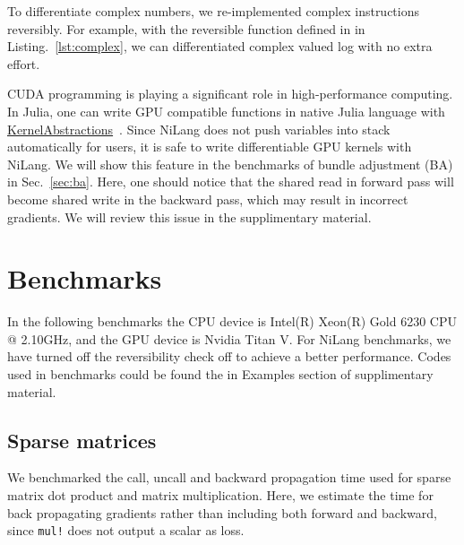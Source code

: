 \documentclass{article}
\newcommand{\<}{\langle}
\renewcommand{\>}{\rangle}
\newcommand{\Lst}[1]{Listing.~\ref{#1}}
\newcommand{\Sec}[1]{Sec.~\ref{#1}}
\theoremstyle{definition}\newtheorem{definition}{\textit{Definition}}
\begin{document}
To differentiate complex numbers, we re-implemented complex instructions reversibly. For example, with the reversible function defined in in \Lst{lst:complex}, we can differentiated complex valued log with no extra effort.

CUDA programming is playing a significant role in high-performance computing. In Julia, one can write GPU compatible functions in native Julia language with \href{https://github.com/JuliaGPU/KernelAbstractions.jl}{KernelAbstractions}~\cite{Besard2018}.
Since NiLang does not push variables into stack automatically for users, it is safe to write differentiable GPU kernels with NiLang.
We will show this feature in the benchmarks of bundle adjustment (BA) in \Sec{sec:ba}.
Here, one should notice that the shared read in forward pass will become shared write in the backward pass, which may result in incorrect gradients. We will review this issue in the supplimentary material.

\section{Benchmarks}\label{sec:benchmark}

In the following benchmarks the CPU device is Intel(R) Xeon(R) Gold 6230 CPU @ 2.10GHz, and the GPU device is Nvidia Titan V.
For NiLang benchmarks, we have turned off the reversibility check off to achieve a better performance. Codes used in benchmarks could be found the in Examples section of supplimentary material.

\subsection{Sparse matrices}\label{sec:benchsparse}
We benchmarked the call, uncall and backward propagation time used for sparse matrix dot product and matrix multiplication.
Here, we estimate the time for back propagating gradients rather than including both forward and backward, since \texttt{mul!} does not output a scalar as loss.
\end{document}
